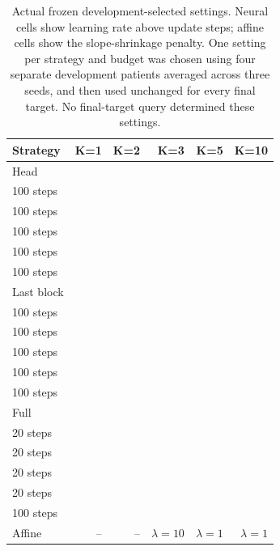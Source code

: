 \documentclass[11pt]{article}
\begin{document}
\begin{table}[!htbp]\centering\scriptsize\setlength{\tabcolsep}{3pt}
\begin{tabular}{lrrrrr}\toprule
Strategy & K=1 & K=2 & K=3 & K=5 & K=10\\\midrule
Head & \shortstack{$10^{-3}$\\100 steps} & \shortstack{$10^{-3}$\\100 steps} & \shortstack{$10^{-3}$\\100 steps} & \shortstack{$10^{-3}$\\100 steps} & \shortstack{$10^{-3}$\\100 steps}\\
Last block & \shortstack{$10^{-4}$\\100 steps} & \shortstack{$10^{-4}$\\100 steps} & \shortstack{$10^{-4}$\\100 steps} & \shortstack{$10^{-4}$\\100 steps} & \shortstack{$10^{-4}$\\100 steps}\\
Full & \shortstack{$10^{-4}$\\20 steps} & \shortstack{$10^{-4}$\\20 steps} & \shortstack{$10^{-4}$\\20 steps} & \shortstack{$10^{-4}$\\20 steps} & \shortstack{$10^{-4}$\\100 steps}\\
Affine & -- & -- & $\lambda=10$ & $\lambda=1$ & $\lambda=1$\\
\bottomrule\end{tabular}
\caption{Actual frozen development-selected settings. Neural cells show learning rate above update steps; affine cells show the slope-shrinkage penalty. One setting per strategy and budget was chosen using four separate development patients averaged across three seeds, and then used unchanged for every final target. No final-target query determined these settings.}\end{table}
\end{document}
